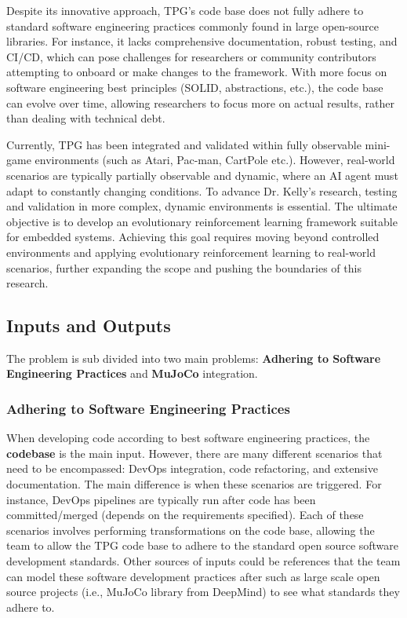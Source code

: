 \documentclass{article}
\begin{document}
Despite its innovative approach, TPG’s code base does not fully adhere to standard software engineering practices commonly found in large open-source libraries. For instance, it lacks comprehensive documentation, robust testing, and CI/CD, which can pose challenges for researchers or community contributors attempting to onboard or make changes to the framework. With more focus on software engineering best principles (SOLID, abstractions, etc.), the code base can evolve over time, allowing researchers to focus more on actual results, rather than dealing with technical debt.

Currently, TPG has been integrated and validated within fully observable mini-game environments (such as Atari, Pac-man, CartPole etc.). However, real-world scenarios are typically partially observable and dynamic, where an AI agent must adapt to constantly changing conditions. To advance Dr. Kelly’s research, testing and validation in more complex, dynamic environments is essential. The ultimate objective is to develop an evolutionary reinforcement learning framework suitable for embedded systems. Achieving this goal requires moving beyond controlled environments and applying evolutionary reinforcement learning to real-world scenarios, further expanding the scope and pushing the boundaries of this research.

\subsection{Inputs and Outputs}

The problem is sub divided into two main problems: \textbf{Adhering to Software Engineering Practices} and \textbf{MuJoCo} integration.

\subsubsection{Adhering to Software Engineering Practices}

When developing code according to best software engineering practices, the \textbf{codebase} is the main input. However, there are many different scenarios that need to be encompassed: DevOps integration, code refactoring, and extensive documentation. The main difference is when these scenarios are triggered. For instance, DevOps pipelines are typically run after code has been committed/merged (depends on the requirements specified). Each of these scenarios involves performing transformations on the code base, allowing the team to allow the TPG code base to adhere to the standard open source software development standards. Other sources of inputs could be references that the team can model these software development practices after such as large scale open source projects (i.e., MuJoCo library from DeepMind) to see what standards they adhere to. 
\end{document}

